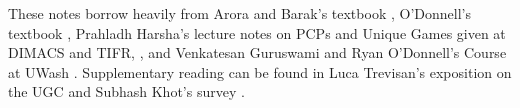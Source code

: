 \noindent These notes borrow heavily from Arora and Barak's textbook \cite{arora2009computational}, O'Donnell's textbook \cite{o2014analysis}, Prahladh Harsha's lecture notes on PCPs and Unique Games given at DIMACS and TIFR\cite{harsha2010limitsTIFR}, \cite{harsha2010limitsDIMACS}, and Venkatesan Guruswami and Ryan O'Donnell's Course at UWash \cite{uwash2005}
. Supplementary reading can be found in Luca Trevisan's exposition on the UGC \cite{trevisan2012khot} and Subhash Khot's survey \cite{khot2005unique}.

